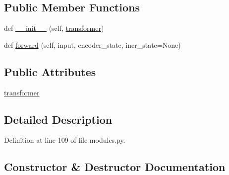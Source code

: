 \subsection*{Public Member Functions}
\begin{DoxyCompactItemize}
\item 
def \hyperlink{classprojects_1_1wizard__of__wikipedia_1_1generator_1_1modules_1_1ContextKnowledgeDecoder_af3dfc40d3aefbe0588b4ab321b6183af}{\+\_\+\+\_\+init\+\_\+\+\_\+} (self, \hyperlink{classprojects_1_1wizard__of__wikipedia_1_1generator_1_1modules_1_1ContextKnowledgeDecoder_a83385b523ae134dcf14e6bc0a9a82b8c}{transformer})
\item 
def \hyperlink{classprojects_1_1wizard__of__wikipedia_1_1generator_1_1modules_1_1ContextKnowledgeDecoder_ae03a16501c3035669816ceb5eb8678f7}{forward} (self, input, encoder\+\_\+state, incr\+\_\+state=None)
\end{DoxyCompactItemize}
\subsection*{Public Attributes}
\begin{DoxyCompactItemize}
\item 
\hyperlink{classprojects_1_1wizard__of__wikipedia_1_1generator_1_1modules_1_1ContextKnowledgeDecoder_a83385b523ae134dcf14e6bc0a9a82b8c}{transformer}
\end{DoxyCompactItemize}


\subsection{Detailed Description}


Definition at line 109 of file modules.\+py.



\subsection{Constructor \& Destructor Documentation}
\mbox{\label{classprojects_1_1wizard__of__wikipedia_1_1generator_1_1modules_1_1ContextKnowledgeDecoder_af3dfc40d3aefbe0588b4ab321b6183af}} 
